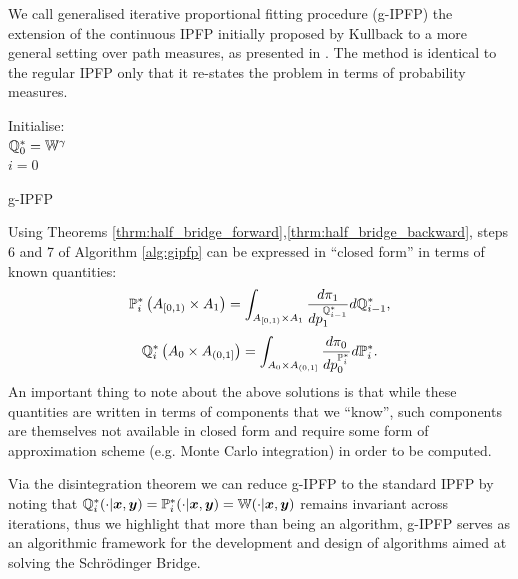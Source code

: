 \documentclass[a4paper,12pt,twoside,openright]{report}
\theoremstyle{definition}
\begin{document}
We call generalised iterative proportional fitting procedure (g-IPFP) the extension of the continuous IPFP initially proposed by Kullback to a more general setting over path measures, as presented in \cite{cramer2000probability, bernton2019schr}. The method is identical to the regular IPFP only that it re-states the problem in terms of probability measures.
\begin{algorithm} \label{alg:gipfp}
Initialise:\\
${\mathbb{Q}}^{*}_0 =\mathbb{W}^{\gamma}$\\
$i=0$ \\
\caption{g-IPFP \citep{cramer2000probability} }
\end{algorithm}

Using Theorems \ref{thrm:half_bridge_forward},\ref{thrm:half_bridge_backward}, steps 6 and 7 of Algorithm \ref{alg:gipfp} can be expressed in ``closed form'' in terms of known quantities:
\begin{align}
    {{\mathbb{P}}}^{*}_i\left( A_{[0,1)} \times A_1\right) =  \int_{ A_{[0,1)} \times A_1}  \frac{d \pi_1}{ d p_1^{{\mathbb{Q}}^{*}_{i-1}}} d{\mathbb{Q}}^{*}_{i-1},
\end{align}
\begin{align}
    {{\mathbb{Q}}}^{*}_i\left(A_0 \times A_{(0,1]}\right) =  \int_{A_0\times A_{(0,1]}} \frac{d \pi_0}{ dp_0^{{\mathbb{P}}^{*}_i}} d{\mathbb{P}}^{*}_i.
\end{align}
An important thing to note about the above solutions is that while these quantities are written in terms of components that we ``know'', such components are themselves not available in closed form and require some form of approximation scheme (e.g. Monte Carlo integration) in order to be computed.

Via the disintegration theorem we can reduce g-IPFP to the standard IPFP by noting that ${\mathbb{Q}}^*_i(\cdot |{\bm{x}},{\bm{y}}) ={\mathbb{P}}^*_i(\cdot |{\bm{x}},{\bm{y}}) = \mathbb{W}(\cdot |{\bm{x}},{\bm{y}})$ remains invariant across iterations, thus we highlight that more than being an algorithm, g-IPFP serves as an algorithmic framework for the development and design of algorithms aimed at solving the Schrödinger Bridge.
\end{document}
